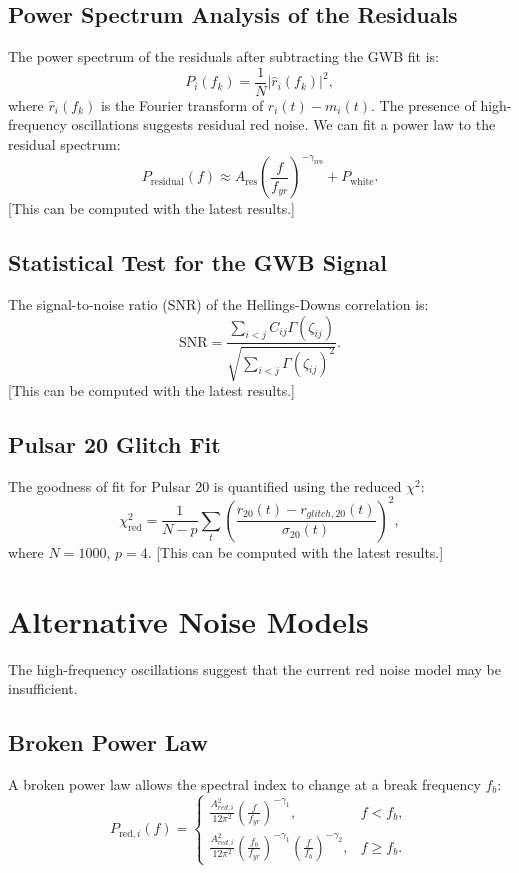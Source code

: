 \documentclass[11pt]{article}
\begin{document}
\subsection{Power Spectrum Analysis of the Residuals}
The power spectrum of the residuals after subtracting the GWB fit is:
\[
P_i(f_k) = \frac{1}{N} |\hat{r}_i(f_k)|^2,
\]
where $\hat{r}_i(f_k)$ is the Fourier transform of $r_i(t) - m_i(t)$. The presence of high-frequency oscillations suggests residual red noise. We can fit a power law to the residual spectrum:
\[
P_{\text{residual}}(f) \approx A_{\text{res}} \left( \frac{f}{f_{yr}} \right)^{-\gamma_{\text{res}}} + P_{\text{white}}.
\]
[This can be computed with the latest results.]

\subsection{Statistical Test for the GWB Signal}
The signal-to-noise ratio (SNR) of the Hellings-Downs correlation is:
\[
\text{SNR} = \frac{\sum_{i<j} C_{ij} \Gamma(\zeta_{ij})}{\sqrt{\sum_{i<j} \Gamma(\zeta_{ij})^2}}.
\]
[This can be computed with the latest results.]

\subsection{Pulsar 20 Glitch Fit}
The goodness of fit for Pulsar 20 is quantified using the reduced $\chi^2$:
\[
\chi^2_{\text{red}} = \frac{1}{N - p} \sum_{t} \left( \frac{r_{20}(t) - r_{glitch,20}(t)}{\sigma_{20}(t)} \right)^2,
\]
where $N = 1000$, $p = 4$. [This can be computed with the latest results.]

\section{Alternative Noise Models}
The high-frequency oscillations suggest that the current red noise model may be insufficient.

\subsection{Broken Power Law}
A broken power law allows the spectral index to change at a break frequency $f_b$:
\[
P_{\text{red},i}(f) =
\begin{cases} 
\frac{A_{red,i}^2}{12 \pi^2} \left( \frac{f}{f_{yr}} \right)^{-\gamma_1}, & f < f_b, \\
\frac{A_{red,i}^2}{12 \pi^2} \left( \frac{f_b}{f_{yr}} \right)^{-\gamma_1} \left( \frac{f}{f_b} \right)^{-\gamma_2}, & f \geq f_b.
\end{cases}
\]
\end{document}
